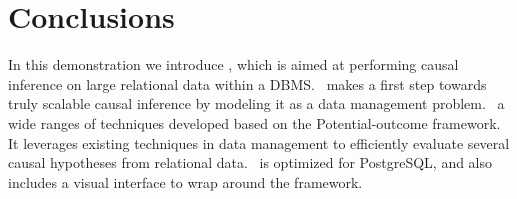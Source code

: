 
\section{Conclusions}
In this demonstration we introduce \GSQL, which is aimed at
performing causal inference
on large relational data within a DBMS. \GSQL\ makes a first step towards truly scalable causal inference by modeling it as a data management problem. \GSQL\ a wide ranges of techniques developed based on the Potential-outcome framework.  It leverages existing techniques
in data management to efficiently evaluate several causal hypotheses
from relational data. \GSQL\ is optimized for PostgreSQL, and also includes a visual interface to wrap around the framework.
